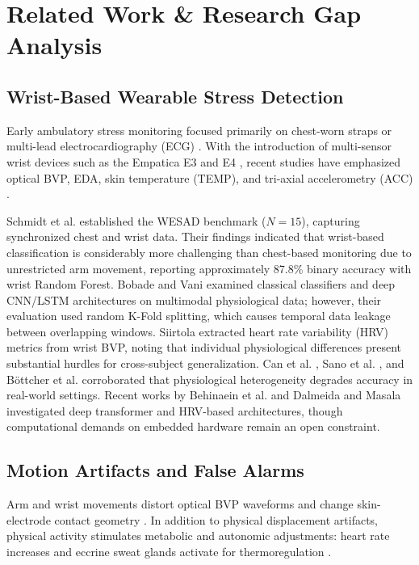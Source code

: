 \documentclass[conference]{IEEEtran}
\begin{document}
\section{Related Work \& Research Gap Analysis}

\subsection{Wrist-Based Wearable Stress Detection}
Early ambulatory stress monitoring focused primarily on chest-worn straps or multi-lead electrocardiography (ECG) \cite{taskforce1996heart}. With the introduction of multi-sensor wrist devices such as the Empatica E3 and E4 \cite{garbarino2014empatica}, recent studies have emphasized optical BVP, EDA, skin temperature (TEMP), and tri-axial accelerometry (ACC) \cite{can2019stress, gjoreski2016continuous}.

Schmidt et al. \cite{schmidt2018wesad} established the WESAD benchmark ($N=15$), capturing synchronized chest and wrist data. Their findings indicated that wrist-based classification is considerably more challenging than chest-based monitoring due to unrestricted arm movement, reporting approximately 87.8\% binary accuracy with wrist Random Forest. Bobade and Vani \cite{bobade2020stress} examined classical classifiers and deep CNN/LSTM architectures on multimodal physiological data; however, their evaluation used random K-Fold splitting, which causes temporal data leakage between overlapping windows. Siirtola \cite{siirtola2019continuous} extracted heart rate variability (HRV) metrics from wrist BVP, noting that individual physiological differences present substantial hurdles for cross-subject generalization. Can et al. \cite{can2019stress}, Sano et al. \cite{sano2018multimodal}, and Böttcher et al. \cite{bottcher2023detection} corroborated that physiological heterogeneity degrades accuracy in real-world settings. Recent works by Behinaein et al. \cite{behinaein2021transformer} and Dalmeida and Masala \cite{dalmeida2021hrv} investigated deep transformer and HRV-based architectures, though computational demands on embedded hardware remain an open constraint.

\subsection{Motion Artifacts and False Alarms}
Arm and wrist movements distort optical BVP waveforms and change skin-electrode contact geometry \cite{tamura2014wearable, zhang2014troika, schumm2008effect}. In addition to physical displacement artifacts, physical activity stimulates metabolic and autonomic adjustments: heart rate increases and eccrine sweat glands activate for thermoregulation \cite{boucsein2012electrodermal}.
\end{document}

